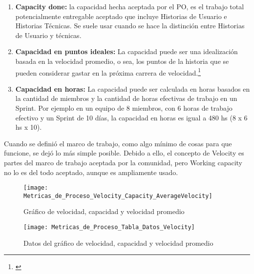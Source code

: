 \begin{enumerate}
{  \begin{enumerate}
  
  \item {\textbf{Capacity done:} la capacidad hecha aceptada por el PO, es el trabajo total potencialmente entregable aceptado que incluye Historias de Usuario e Historias Técnicas. Se suele usar cuando se hace la distinción entre Historias de Usuario y técnicas.}
  
  \item {\textbf{Capacidad en puntos ideales:} La capacidad puede ser una idealización basada en la velocidad promedio, o sea, los puntos de la historia que se pueden considerar gastar en la próxima carrera de velocidad.\footnote{\cite{Satish-Thatte-2013}}}

  \item {\textbf{Capacidad en horas:} La capacidad puede ser calculada en horas basados en la cantidad de miembros y la cantidad de horas efectivas de trabajo en un Sprint. Por ejemplo en un equipo de 8 miembros, con 6 horas de trabajo efectivo y un Sprint de 10 días, la capacidad en horas es igual a 480 hs (8 x 6 hs x 10).}

  \end{enumerate}

Cuando se definió el marco de trabajo, como algo mínimo de cosas para que funcione, se dejó lo más simple posible. Debido a ello, el concepto de Velocity es partes del marco de trabajo aceptada por la comunidad, pero Working capacity no lo es del todo aceptado, aunque es ampliamente usado.


  \begin{figure}[h]
  \centering
  \texttt{[image: Metricas\_de\_Proceso\_Velocity\_Capacity\_AverageVelocity]}
  \caption{Gráfico de velocidad, capacidad y velocidad promedio}
  \centering
  \label{fig:Metricas_de_Proceso_Velocity_Capacity_AverageVelocity} %
  \end{figure}
  \FloatBarrier
  
  \begin{figure}[h]
  \centering
  \texttt{[image: Metricas\_de\_Proceso\_Tabla\_Datos\_Velocity]}
  \caption{Datos del gráfico de velocidad, capacidad y velocidad promedio}
  \centering
  \label{fig:Metricas_de_Proceso_Tabla_Datos_Velocity} %
  \end{figure}
  \FloatBarrier
}


\end{enumerate}
